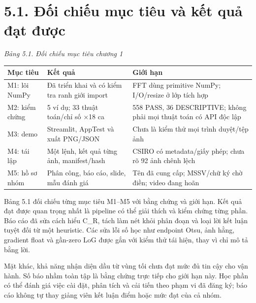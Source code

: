 \documentclass[13pt,a4paper]{extreport}
\begin{document}
\section*{5.1. Đối chiếu mục tiêu và kết quả đạt được}
\noindent\textit{Bảng 5.1. Đối chiếu mục tiêu chương 1}
\begin{longtable}{p{4.87cm}|p{4.87cm}|p{4.87cm}}
Mục tiêu & Kết quả & Giới hạn\\\hline
M1: lõi NumPy & Đã triển khai và có kiểm tra ranh giới import & FFT dùng primitive NumPy; I/O/resize ở lớp tích hợp\\\hline
M2: kiểm chứng & 5 ví dụ; 33 thuật toán/chỉ số ×18 ca & 558 PASS, 36 DESCRIPTIVE; không phải mọi thuật toán có API độc lập\\\hline
M3: demo & Streamlit, AppTest và xuất PNG/JSON & Chưa là kiểm thử mọi trình duyệt/tệp ảnh\\\hline
M4: tái lập & Một lệnh, kết quả từng ảnh, manifest/hash & CSIRO có metadata/giấy phép; chưa rõ 92 ảnh chênh lệch\\\hline
M5: hồ sơ nhóm & Phân công, báo cáo, slide, mẫu đánh giá & Tên đã cung cấp; MSSV/chữ ký chờ điền; video đang hoãn\\\hline
\end{longtable}
Bảng 5.1 đối chiếu từng mục tiêu M1–M5 với bằng chứng và giới hạn. Kết quả đạt được quan trọng nhất là pipeline có thể giải thích và kiểm chứng từng phần. Báo cáo đã sửa cách hiểu C\_R, tách làm nét khỏi phân đoạn và loại lời kết luận tuyệt đối từ một heuristic. Các sửa lỗi số học như endpoint Otsu, ảnh hằng, gradient float và gần-zero LoG được gắn với kiểm thử tái hiện, thay vì chỉ mô tả bằng lời.
\par
Mặt khác, khả năng nhận diện dầu từ vùng tối chưa đạt mức đủ tin cậy cho vận hành. Số báo nhầm toàn tập là bằng chứng trực tiếp cho giới hạn này. Học phần có thể đánh giá việc cài đặt, phân tích và cải tiến theo phạm vi đã đăng ký; báo cáo không tự thay giảng viên kết luận điểm hoặc mức đạt của cả nhóm.
\par
\clearpage
\end{document}
